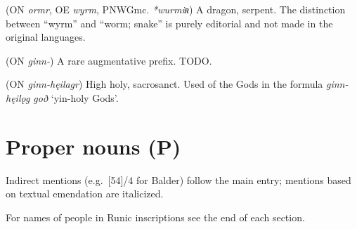 \begin{itemize}
 (ON \emph{ormr}, OE \emph{wyrm}, PNWGmc. \emph{*wurmiʀ})
  A dragon, serpent.  The distinction between “wyrm” and “worm; snake” is purely editorial and not made in the original languages.

 (ON \emph{ginn-})
  A rare augmentative prefix. TODO.

 (ON \emph{ginn-hęilagr})
  High holy, sacrosanct.  Used of the Gods in the formula \emph{ginn-hęilǫg goð} ‘yin-holy Gods’.

\end{itemize}

\newpage

\section{Proper nouns (P)}

Indirect mentions (e.g.~[54]/4 for Balder) follow the main entry; mentions based on textual emendation are italicized.

For names of people in Runic inscriptions see the end of each section.

